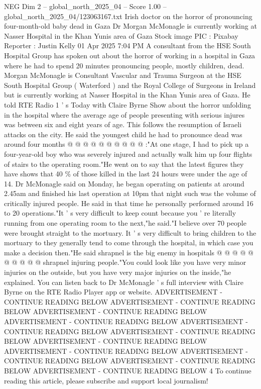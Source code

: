 \begin{textsample}{NEG Dim 2 – global\_north\_2025\_04 – Score 1.00 – global\_north\_2025\_04/123063167.txt}  \label{ex:f2_neg_016}
Irish doctor on the horror of pronouncing four-month-old baby dead in Gaza Dr Morgan McMonagle is currently working at Nasser Hospital in the Khan Yunis area of Gaza Stock image PIC : Pixabay Reporter : Justin Kelly 01 Apr 2025 7:04 PM A consultant from the HSE South Hospital Group has spoken out about the horror of working in a hospital in Gaza where he had to spend 20 minutes pronouncing people, mostly children, dead.
Morgan McMonagle is Consultant Vascular and Trauma Surgeon at the HSE South Hospital Group ( Waterford ) and the Royal College of Surgeons in Ireland but is currently working at Nasser Hospital in the Khan Yunis area of Gaza.
He told RTE Radio 1 ' s Today with Claire Byrne Show about the horror unfolding in the hospital where the average age of people presenting with serious injures was between six and eight years of age.
This follows the resumption of Israeli attacks on the city.
He said the youngest child he had to pronounce dead was around four months @ @ @ @ @ @ @ @ @ @ :"At one stage, I had to pick up a four-year-old boy who was severely injured and actually walk him up four flights of stairs to the operating room."He went on to say that the latest figures they have shows that 40 \% of those killed in the last 24 hours were under the age of 14.
Dr McMonagle said on Monday, he began operating on patients at around 2.45am and finished his last operation at 10pm that night such was the volume of critically injured people.
He said in that time he personally performed around 16 to 20 operations."It ' s very difficult to keep count because you ' re literally running from one operating room to the next,"he said."I believe over 70 people were brought straight to the mortuary.
It ' s very difficult to bring children to the mortuary to they generally tend to come through the hospital, in which case you make a decision then."He said shrapnel is the big enemy in hospitals @ @ @ @ @ @ @ @ @ @ shrapnel injuring people."You could look like you have very minor injuries on the outside, but you have very major injuries on the inside,"he explained.
You can listen back to Dr McMonagle ' s full interview with Claire Byrne on the RTE Radio Player app or website.
ADVERTISEMENT - CONTINUE READING BELOW ADVERTISEMENT - CONTINUE READING BELOW ADVERTISEMENT - CONTINUE READING BELOW ADVERTISEMENT - CONTINUE READING BELOW ADVERTISEMENT - CONTINUE READING BELOW ADVERTISEMENT - CONTINUE READING BELOW ADVERTISEMENT - CONTINUE READING BELOW ADVERTISEMENT - CONTINUE READING BELOW ADVERTISEMENT - CONTINUE READING BELOW ADVERTISEMENT - CONTINUE READING BELOW ADVERTISEMENT - CONTINUE READING BELOW 4 To continue reading this article, please subscribe and support local journalism!

\end{textsample}
